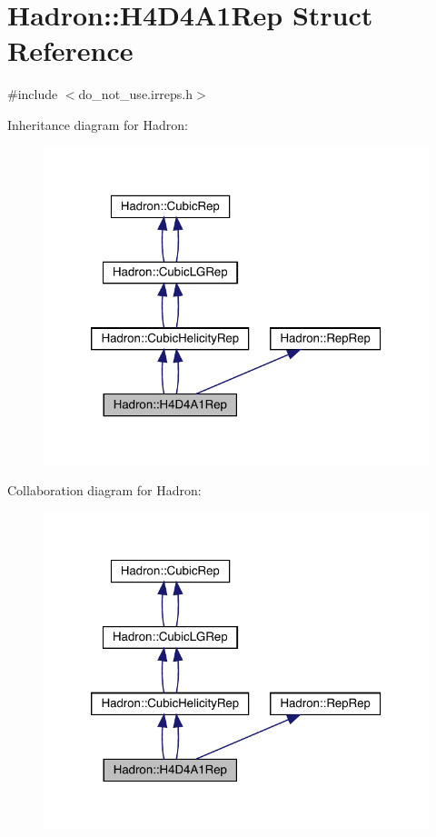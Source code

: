 \hypertarget{structHadron_1_1H4D4A1Rep}{}\section{Hadron\+:\+:H4\+D4\+A1\+Rep Struct Reference}
\label{structHadron_1_1H4D4A1Rep}


{\ttfamily \#include $<$do\+\_\+not\+\_\+use.\+irreps.\+h$>$}



Inheritance diagram for Hadron\+:\nopagebreak
\begin{figure}[H]
\begin{center}
\leavevmode
\includegraphics[width=320pt]{d4/d74/structHadron_1_1H4D4A1Rep__inherit__graph}
\end{center}
\end{figure}


Collaboration diagram for Hadron\+:\nopagebreak
\begin{figure}[H]
\begin{center}
\leavevmode
\includegraphics[width=320pt]{db/d4a/structHadron_1_1H4D4A1Rep__coll__graph}
\end{center}
\end{figure}
